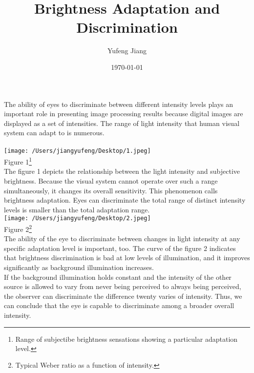 \documentclass[11pt,oneside]{article}
\title{Brightness Adaptation and Discrimination}
\author{Yufeng Jiang}
\date{\today}
\begin{document}
\maketitle
The ability of eyes to discriminate between different intensity levels plays an important role in presenting image processing results because digital images are displayed as a set of intensities. The range of light intensity that human visual system can adapt to is numerous.\\
\\
\texttt{[image: /Users/jiangyufeng/Desktop/1.jpeg]}\\
Figure 1\footnote{Range of subjectibe brightness sensations showing a particular adaptation level.} \\
\indent The figure 1 depicts the relationship between the light intensity and subjective brightness. Because the visual system cannot operate over such a range simultaneously, it changes its overall sensitivity. This phenomenon calls brightness adaptation. Eyes can {}discriminate the total range of distinct intensity levels is smaller than the total adaptation range. \\
\texttt{[image: /Users/jiangyufeng/Desktop/2.jpeg]}\\
Figure 2\footnote{Typical Weber ratio as a function of intensity.}\\
\indent The ability of the eye to discriminate between changes in light intensity at any specific adaptation level is important, too. The curve of the figure 2 indicates that brightness discrimination is bad at low levels of illumination, and it improves significantly as background illumination increases. \\
\indent If the background illumination holds constant and the intensity of the other source is allowed to vary from never being perceived to always being perceived, the observer can discriminate the difference twenty varies of intensity. Thus, we can conclude that the eye is capable to discriminate among a broader overall intensity.
\end{document}
